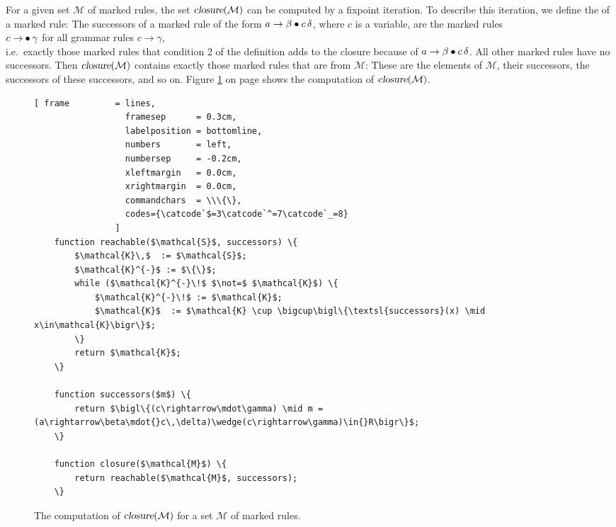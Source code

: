 \noindent
For a given set \(\mathcal{M}\) of marked rules, the set \(\textsl{closure}(\mathcal{M})\) can be computed by a
fixpoint iteration.  To describe this iteration, we define the  of a marked rule:
The successors of a marked rule of the form \(a \rightarrow \beta \mdot c\, \delta\), where \(c\) is a variable, are
the marked rules
\\[0.2cm]
\hspace*{1.3cm}
\(c \rightarrow \mdot \gamma\) \quad for all grammar rules \quad \(c \rightarrow \gamma\),
\\[0.2cm]
i.e.~exactly those marked rules that condition 2 of the definition adds to the closure because of
\(a \rightarrow \beta \mdot c\, \delta\).  All other marked rules have no successors.  Then
\(\textsl{closure}(\mathcal{M})\) contains exactly those marked rules that are 
from \(\mathcal{M}\):  These are the elements of \(\mathcal{M}\), their successors, the successors of these
successors, and so on.  Figure \ref{fig:slr-closure} on page \pageref{fig:slr-closure} shows the computation of
\(\textsl{closure}(\mathcal{M})\).

\begin{figure}[!ht]
  \centering

\begin{Verbatim}[ frame         = lines,
                  framesep      = 0.3cm,
                  labelposition = bottomline,
                  numbers       = left,
                  numbersep     = -0.2cm,
                  xleftmargin   = 0.0cm,
                  xrightmargin  = 0.0cm,
                  commandchars  = \\\{\},
                  codes={\catcode`$=3\catcode`^=7\catcode`_=8}
                ]
    function reachable($\mathcal{S}$, successors) \{
        $\mathcal{K}\,$  := $\mathcal{S}$;
        $\mathcal{K}^{-}$ := $\{\}$;
        while ($\mathcal{K}^{-}\!$ $\not=$ $\mathcal{K}$) \{
            $\mathcal{K}^{-}\!$ := $\mathcal{K}$;
            $\mathcal{K}$  := $\mathcal{K} \cup \bigcup\bigl\{\textsl{successors}(x) \mid x\in\mathcal{K}\bigr\}$;
        \}
        return $\mathcal{K}$;
    \}

    function successors($m$) \{
        return $\bigl\{(c\rightarrow\mdot\gamma) \mid m = (a\rightarrow\beta\mdot{}c\,\delta)\wedge(c\rightarrow\gamma)\in{}R\bigr\}$;
    \}

    function closure($\mathcal{M}$) \{
        return reachable($\mathcal{M}$, successors);
    \}
\end{Verbatim}
\vspace*{-0.3cm}
\caption{The computation of $\textsl{closure}(\mathcal{M})$ for a set $\mathcal{M}$ of marked rules.}
\label{fig:slr-closure}
\end{figure}

